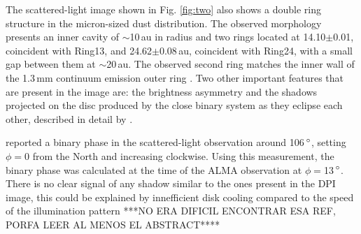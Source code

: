 \documentclass[letters,usenatbib,times]{mnras}
\begin{document}
The scattered-light image shown in Fig. \ref{fig:two} also shows  a double ring structure in the micron-sized dust distribution. The observed morphology presents an inner cavity of $\sim$10\,au in radius and two rings located at 14.10$\pm$0.01, coincident with Ring13,  and 24.62$\pm$0.08\,au, coincident with Ring24,  with a small gap between them at $\sim$20\,au. The observed second ring  matches   the inner wall of the 1.3\,mm continuum emission outer ring \citep{Ru_z_Rodr_guez_2019}. Two other important features that are present in the image are: the brightness asymmetry and the shadows projected on the disc produced by the close binary system as they eclipse each other, described in detail by \citet{dOrazi}.


\citet{dOrazi} reported a  binary phase in the scattered-light observation around 106\,$\hbox{$^\circ$}$, setting $\phi=$0 from the North and increasing clockwise. Using this measurement, the binary phase was calculated at the time of the ALMA observation at $\phi=$13\,$\hbox{$^\circ$}$. There is no clear signal of any shadow similar to the ones present in the DPI image, this could be explained by innefficient disk cooling compared to the speed of the illumination pattern \citep[][]{Casassus2019MNRAS.486L..58C} ***NO ERA DIFICIL ENCONTRAR ESA REF, PORFA LEER AL MENOS EL ABSTRACT****
\end{document}
